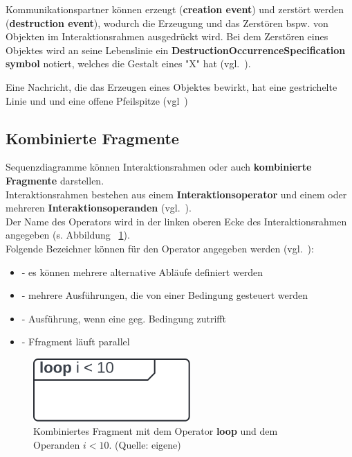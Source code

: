 \noindent
Kommunikationspartner können erzeugt (\textbf{creation event}) und zerstört werden (\textbf{destruction event}), wodurch die Erzeugung und das Zerstören bspw. von Objekten im Interaktionsrahmen ausgedrückt wird.
Bei dem Zerstören eines Objektes wird an seine Lebenslinie ein \textbf{DestructionOccurrenceSpecification symbol} notiert, welches die Gestalt eines "X" hat (vgl.~\cite[578]{OMG17}).

\begin{tcolorbox}[title=creation event, colback=white]
    Eine Nachricht, die das Erzeugen eines Objektes bewirkt, hat eine gestrichelte Linie und und eine offene Pfeilspitze (vgl~\cite[577]{OMG17})
\end{tcolorbox}

\subsection{Kombinierte Fragmente}
Sequenzdiagramme können Interaktionsrahmen oder auch \textbf{kombinierte Fragmente} darstellen.\\
Interaktionsrahmen bestehen aus einem \textbf{Interaktionsoperator} und einem oder mehreren \textbf{Interaktionsoperanden} (vgl.~\cite[582]{OMG17}).\\
Der Name des Operators wird in der linken oberen Ecke des Interaktionsrahmen angegeben (s. Abbildung ~\ref{fig:interaktionsoperand}).\\
Folgende Bezeichner können für den Operator angegeben werden (vgl.~\cite[583]{OMG17}):

\begin{itemize}
    \item {} - es können mehrere alternative Abläufe definiert werden
    \item {} - mehrere Ausführungen, die von einer Bedingung gesteuert werden
    \item {} - Ausführung, wenn eine geg. Bedingung zutrifft
    \item {} - Ffragment läuft parallel
\end{itemize}

\begin{figure}
    \centering
    \includegraphics[scale=0.5]{part three/Sequenzdiagramme/img/interaktionsoperand}
    \caption{Kombiniertes Fragment mit dem Operator \textbf{loop} und dem Operanden $i < 10$. (Quelle: eigene)}
    \label{fig:interaktionsoperand}
\end{figure}

